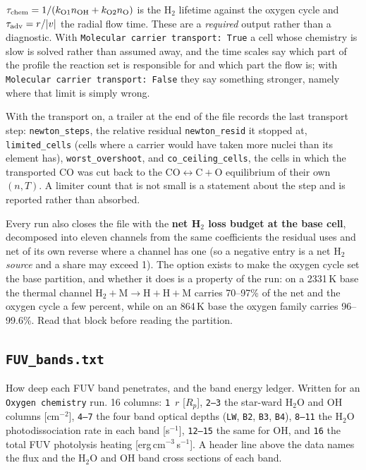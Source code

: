 \documentclass[english,a4paper]{my_memo}
\newcommand{\rp}{\ensuremath{R_p}}   %
\begin{document}
$\tau_{\rm chem} = 1/(k_{\rm O1}n_{\rm OH}+k_{\rm O2}n_{\rm O})$ is the H$_2$
lifetime against the oxygen cycle and $\tau_{\rm adv}=r/|v|$ the radial flow
time. These are a \emph{required} output rather than a diagnostic. With
\texttt{Molecular carrier transport: True} a cell whose chemistry is slow is solved rather
than assumed away, and the time scales say which part of the profile the
reaction set is responsible for and which part the flow is; with
\texttt{Molecular carrier transport: False} they say something stronger, namely where that
limit is simply wrong.

With the transport on, a trailer at the end of the file records the last
transport step: \texttt{newton\_steps}, the relative residual
\texttt{newton\_resid} it stopped at, \texttt{limited\_cells} (cells where a
carrier would have taken more nuclei than its element has),
\texttt{worst\_overshoot}, and \texttt{co\_ceiling\_cells}, the cells in
which the transported CO was cut back to the $\mathrm{CO\leftrightarrow C+O}$
equilibrium of their own $(n,T)$. A limiter count that is not small is a
statement about the step and is reported rather than absorbed.

Every run also closes the file with the \textbf{net H$_2$ loss budget at the
base cell}, decomposed into eleven channels from the same coefficients the
residual uses and net of its own reverse where a channel has one (so a negative
entry is a net H$_2$ \emph{source} and a share may exceed 1). The option exists
to make the oxygen cycle set the base partition, and whether it does is a
property of the run: on a 2331\,K base the thermal channel
$\mathrm{H_2+M\to H+H+M}$ carries 70--97\% of the net and the oxygen cycle a
few percent, while on an 864\,K base the oxygen family carries 96--99.6\%.
Read that block before reading the partition.

\subsection{\texttt{FUV\_bands.txt}}
How deep each FUV band penetrates, and the band energy ledger. Written for an
\texttt{Oxygen chemistry} run. 16 columns: \texttt{1}~$r$ [\rp], \texttt{2--3}
the star-ward H$_2$O and OH columns [cm$^{-2}$], \texttt{4--7} the four band
optical depths (\texttt{LW}, \texttt{B2}, \texttt{B3},
\texttt{B4}), \texttt{8--11} the H$_2$O photodissociation rate in each band
[s$^{-1}$], \texttt{12--15} the same for OH, and \texttt{16} the total FUV
photolysis heating [erg\,cm$^{-3}$\,s$^{-1}$]. A header line above the data
names the flux and the H$_2$O and OH band cross sections of each band.
\end{document}
